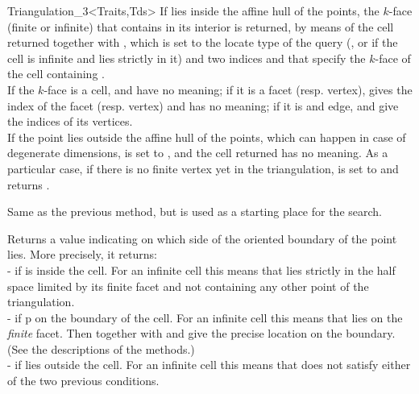 \begin{ccClassTemplate}{Triangulation_3<Traits,Tds>}
{If  lies inside the affine hull of the points, the $k$-face
(finite or infinite) that contains  in its interior is
returned, by means of the cell returned together with , which
is set to the locate type of the query (, or  if the cell is infinite and 
lies strictly in it) and two indices  and  that
specify the $k$-face of the cell containing .\\ 
If the $k$-face is a cell,  and  have no
meaning; if it is a facet (resp. vertex),  gives the index of
the facet (resp. vertex) and  has no meaning; if it is and
edge,  and  give the indices of its vertices.\\ 
If the point  lies outside the affine hull of the points,
which can happen in case of degenerate dimensions,  is set to
, and the cell returned has no meaning.
As a particular case, if there is no finite vertex yet in the
triangulation,  is set to  and
 returns . 
}

{Same as the previous method, but  is used as a starting
place for the search.}

{Returns a value indicating on which side of the oriented boundary
of  the point  lies. More precisely, it returns:\\
-  if  is inside the cell. For an infinite
cell this means that  lies strictly in the half space limited by
its finite facet and not containing any other point of the triangulation. \\
-  if p on the boundary of the cell. For an infinite
cell this means that  lies on the \textit{finite} facet. Then
 together with  and  give the precise location
on the boundary. (See the descriptions of the  methods.)\\ 
-  if  lies outside the cell. For an
infinite cell this means that  does not satisfy either of the
two previous conditions.  
}


\end{ccClassTemplate}
